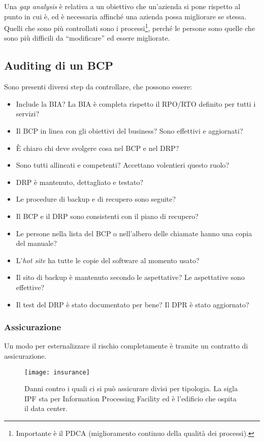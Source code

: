 Una \textit{gap analysis} è relativa a un obiettivo che un'azienda si pone
rispetto al punto in cui è, ed è necessaria affinché una azienda possa
migliorare se stessa. Quelli che sono più controllati sono i
processi\footnote{Importante è il PDCA (miglioramento continuo della qualità
dei processi).}, perché le persone sono quelle che sono più difficili da
``modificare'' ed essere migliorate.

\subsection{Auditing di un BCP}

Sono presenti diversi step da controllare, che possono essere:
\begin{itemize}
  \item Include la BIA? La BIA è completa rispetto il RPO/RTO definito per 
  tutti i servizi?
  \item Il BCP in linea con gli obiettivi del business? Sono effettivi e 
  aggiornati?
  \item È chiaro chi deve svolgere cosa nel BCP e nel DRP?
  \item Sono tutti allineati e competenti? Accettano volentieri questo ruolo?
  \item DRP è mantenuto, dettagliato e testato?
  \item Le procedure di backup e di recupero sono seguite?
  \item Il BCP e il DRP sono consistenti con il piano di recupero?
  \item Le persone nella lista del BCP o nell'albero delle chiamate hanno una
  copia del manuale?
  \item L'\textit{hot site} ha tutte le copie del software al momento usato?
  \item Il sito di backup è mantenuto secondo le aspettative? Le 
  aspettative sono effettive?
  \item Il test del DRP è stato documentato per bene? Il DPR è stato 
  aggiornato?
\end{itemize}

\subsubsection{Assicurazione}

Un modo per esternalizzare il rischio completamente è tramite un contratto di
assicurazione.

\begin{figure}[H]
\centering
\texttt{[image: insurance]}
\caption[Danni contro i quali ci si può assicurare divisi per
tipologia]{Danni contro i quali ci si può assicurare divisi per
tipologia. La sigla IPF sta per Information Processing Facility
ed è l'edificio che ospita il data center.}
\label{fig:insurance}
\end{figure}


